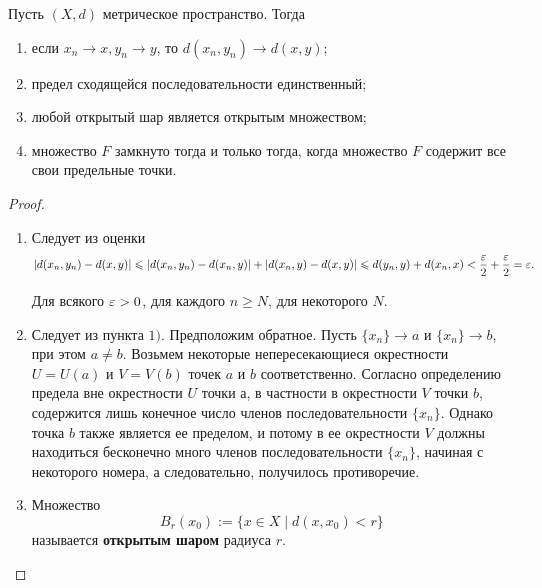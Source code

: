 \documentclass[a4paper]{article}
\theoremstyle{named}
\begin{document}
    \begin{lemma*}
        Пусть $(X, d)$ метрическое пространство. Тогда
        \begin{enumerate}
        \item
            если $x_n \to x, y_n \to y$, то $d(x_n, y_n) \to d(x, y)$;

        \item
            предел сходящейся последовательности единственный;

        \item
            любой открытый шар является открытым множеством;

        \item
            множество $F$ замкнуто тогда и только тогда, когда множество $F$ содержит все свои предельные точки.
        \end{enumerate}

        \begin{proof}
            ~

            \begin{enumerate}
            \item
                Следует из оценки
                \begin{equation*}
                    |d(x_n, y_n) - d(x, y)| \leqslant |d(x_n, y_n) - d(x_n, y)| + |d(x_n, y) - d(x, y)| \leqslant d(y_n, y) + d(x_n, x) < \dfrac{\varepsilon}{2} + \dfrac{\varepsilon}{2} = \varepsilon.
                \end{equation*}

                Для всякого $\varepsilon > 0$, для каждого $n \geq N$, для некоторого $N$. 

            \item
                Следует из пункта $1)$. Предположим обратное. Пусть $\{x_n\} \to a$ и $\{x_n\} \to b$, при этом $a \neq b$. Возьмем некоторые непересекающиеся окрестности $U = U(a)$ и $V = V(b)$ точек $a$ и $b$ соответственно. Согласно определению предела вне окрестности $U$ точки $а$, в частности в окрестности $V$ точки $b$, содержится лишь конечное число членов последовательности $\{x_n\}$. Однако точка $b$ также является ее пределом, и потому в ее окрестности $V$ должны находиться бесконечно много членов последовательности $\{x_n\}$, начиная с некоторого номера, а следовательно, получилось противоречие. 

            \item
                \begin{definition*}
                    Множество 
                    \begin{equation*}
                        B_r(x_0) := \{x \in X \mid d(x, x_0) < r\}
                    \end{equation*}
                    называется \textbf{открытым шаром} радиуса $r$.
                \end{definition*}


\end{enumerate}
\end{proof}
\end{lemma*}
\end{document}

